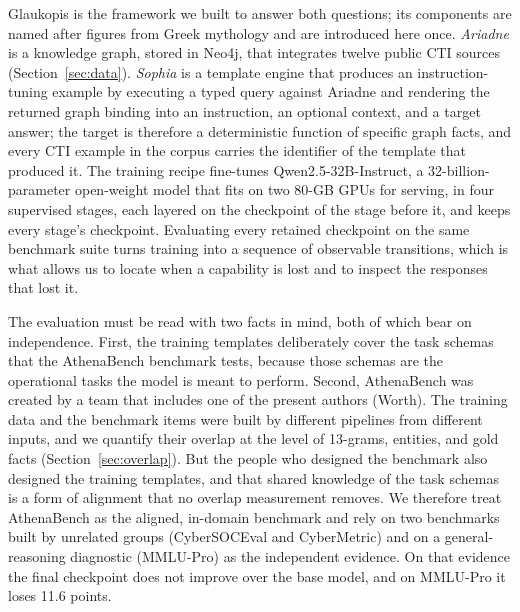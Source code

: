 \documentclass[a4paper,fleqn]{cas-dc}
\begin{document}
Glaukopis is the framework we built to answer both questions; its components are named after figures from Greek mythology and are introduced here once. \emph{Ariadne} is a knowledge graph, stored in Neo4j, that integrates twelve public CTI sources (Section~\ref{sec:data}). \emph{Sophia} is a template engine that produces an instruction-tuning example by executing a typed query against Ariadne and rendering the returned graph binding into an instruction, an optional context, and a target answer; the target is therefore a deterministic function of specific graph facts, and every CTI example in the corpus carries the identifier of the template that produced it. The training recipe fine-tunes Qwen2.5-32B-Instruct, a 32-billion-parameter open-weight model that fits on two 80-GB GPUs for serving, in four supervised stages, each layered on the checkpoint of the stage before it, and keeps every stage's checkpoint. Evaluating every retained checkpoint on the same benchmark suite turns training into a sequence of observable transitions, which is what allows us to locate when a capability is lost and to inspect the responses that lost it.

The evaluation must be read with two facts in mind, both of which bear on independence. First, the training templates deliberately cover the task schemas that the AthenaBench benchmark tests, because those schemas are the operational tasks the model is meant to perform. Second, AthenaBench was created by a team that includes one of the present authors (Worth). The training data and the benchmark items were built by different pipelines from different inputs, and we quantify their overlap at the level of 13-grams, entities, and gold facts (Section~\ref{sec:overlap}). But the people who designed the benchmark also designed the training templates, and that shared knowledge of the task schemas is a form of alignment that no overlap measurement removes. We therefore treat AthenaBench as the aligned, in-domain benchmark and rely on two benchmarks built by unrelated groups (CyberSOCEval and CyberMetric) and on a general-reasoning diagnostic (MMLU-Pro) as the independent evidence. On that evidence the final checkpoint does not improve over the base model, and on MMLU-Pro it loses 11.6 points.
\end{document}
